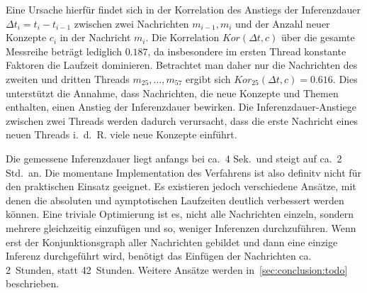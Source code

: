 Eine Ursache hierfür findet sich in der Korrelation des Anstiegs der Inferenzdauer $\Delta t_i = t_i - t_{i - 1}$ zwischen zwei Nachrichten $m_{i - 1}, m_i$ und der Anzahl neuer Konzepte $c_i$ in der Nachricht $m_i$.
Die Korrelation $Kor(\Delta t, c)$ über die gesamte Messreihe beträgt lediglich $0.187$, da insbesondere im ersten Thread konstante Faktoren die Laufzeit dominieren.
Betrachtet man daher nur die Nachrichten des zweiten und dritten Threads $m_{25}, \dots, m_{57}$ ergibt sich $Kor_{25}(\Delta t, c) = 0.616$.
Dies unterstützt die Annahme, dass Nachrichten, die neue Konzepte und Themen enthalten, einen Anstieg der Inferenzdauer bewirken.
Die Inferenzdauer-Anstiege zwischen zwei Threads werden dadurch verursacht, dass die erste Nachricht eines neuen Threads i.~d.~R. viele neue Konzepte einführt.

Die gemessene Inferenzdauer liegt anfangs bei ca.\ 4 Sek.\ und steigt auf ca.\ 2 Std.\ an.
Die momentane Implementation des Verfahrens ist also definitv nicht für den praktischen Einsatz geeignet.
Es existieren jedoch verschiedene Ansätze, mit denen die absoluten und aymptotischen Laufzeiten deutlich verbessert werden können.
Eine triviale Optimierung ist es, nicht alle Nachrichten einzeln, sondern mehrere gleichzeitig einzufügen und so, weniger Inferenzen durchzuführen.
Wenn erst der Konjunktionsgraph aller Nachrichten gebildet und dann eine einzige Inferenz durchgeführt wird, benötigt das Einfügen der Nachrichten ca. 2~Stunden, statt 42~Stunden.
Weitere Ansätze werden in~\ref{sec:conclusion:todo} beschrieben.
